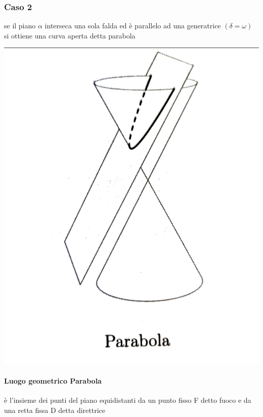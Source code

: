 \documentclass[a4paper,11pt]{article}
\begin{document}
\subsubsection{Caso 2}
se il piano \( \alpha \) interseca una sola falda ed è parallelo ad una generatrice \( ( \delta = \omega) \) si ottiene una curva aperta detta parabola
\begin{center}
\begin{minipage}{8cm}
    \includegraphics[scale=0.3]{parabola.png}
\end{minipage}
\end{center}
\paragraph{Luogo geometrico Parabola}
è l'insieme dei punti del piano equidistanti da un punto fisso F detto fuoco e da una retta fissa D detta direttrice
\end{document}
